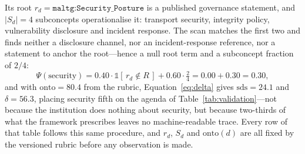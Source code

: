 \documentclass[engproc,proceedingpaper,submit,moreauthors]{Definitions/mdpi}
\begin{document}
    Its root $r_d=\texttt{maltg:Security\_Posture}$ is a published governance statement, and $|S_d|=4$ subconcepts operationalise it: transport security, integrity policy, vulnerability disclosure and incident response. The scan matches the first two and finds neither a disclosure channel, nor an incident-response reference, nor a statement to anchor the root---hence a null root term and a subconcept fraction of $2/4$:
\[
\Psi(\text{security})=0.40\cdot\mathbb{1}[\,r_d\!\notin\!R\,]+0.60\cdot\tfrac{2}{4}=0.00+0.30=0.30,
\]
and with $\mathrm{onto}=80.4$ from the rubric, Equation~\eqref{eq:delta} gives $\mathrm{sds}=24.1$ and $\delta=56.3$, placing security fifth on the agenda of Table~\ref{tab:validation}---not because the institution does nothing about security, but because two-thirds of what the framework prescribes leaves no machine-readable trace. Every row of that table follows this same procedure, and $r_d$, $S_d$ and $\mathrm{onto}(d)$ are all fixed by the versioned rubric before any observation is made.
\end{document}

